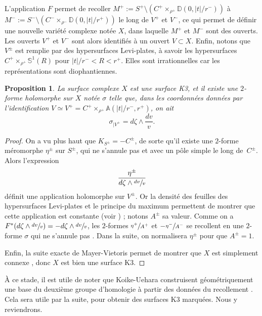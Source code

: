 \documentclass[JEP,XML,SOM,Unicode,francais,published]{cedram}
\newtheorem{prop}[thm]{Proposition}
\theoremstyle{definition}
\begin{document}
L'application $F$ permet de recoller $M^+:= S^+\setminus(C^+\times_{\rho^{+}}\mathbb{D}(0, |t|/r^-))$ à $M^-:= S^-\setminus(C^-\times_{\rho^{-}}\mathbb{D}(0, |t|/r^+))$ le long de $V^+$ et $V^-$, ce qui permet de définir une nouvelle variété complexe notée $X$, dans laquelle $M^+$ et $M^-$ sont des ouverts. Les ouverts $V^+$ et $V^-$ sont alors identifiés à un ouvert $V \subset X$. Enfin, notons que $V^\pm$ est remplie par des hypersurfaces Levi-plates, à savoir les hypersurfaces $C^+\times_{\rho^+} \mathbb{S}^1(R)$ pour $|t|/r^- < R < r^+$. Elles sont irrationnelles car les représentations sont diophantiennes.

\begin{prop}La surface complexe $X$ est une surface K3, et il existe une $2$-forme holomorphe sur $X$ notée $\sigma$ telle que, dans les coordonnées données par l'identification $V \simeq V^+ = C^+\times_{\rho^+} \mathbb{A}(|t|/r^-, r^+)$, on ait
\[\sigma_{|V^+} = d\zeta \wedge \frac{dv}{v}.\]
\end{prop}
\begin{proof}On a vu plus haut que $K_{S^\pm} = -C^\pm$, de sorte qu'il existe une $2$-forme méromorphe $\eta^\pm$ sur $S^\pm$, qui ne s'annule pas et avec un pôle simple le long de~$C^\pm$. Alors l'expression
\[\frac{\eta^\pm}{d\zeta \wedge \sfrac{dv}{v}}\]
définit une application holomorphe sur $V^\pm$. Or la densité des feuilles des hypersurfaces Levi-plates et le principe du maximum permettent de montrer que cette application est constante (voir \cite[lem.\,2.2]{koike2019gluing}) ; notons $A^\pm$ sa valeur. Comme on a $F^*(d\zeta \wedge \sfrac{dv}{v}) = -d\zeta\wedge\sfrac{dv}{v}$, les $2$-formes $\sfrac{\eta^+}{A^+}$ et $-\sfrac{\eta^-}{A^-}$ se recollent en une $2$-forme $\sigma$ qui ne s'annule pas \cite[prop.\,2.1]{koike2019gluing}. Dans la suite, on normalisera $\eta^\pm$ pour que $A^\pm = 1$.

Enfin, la suite exacte de Mayer-Vietoris permet de montrer que $X$ est simplement connexe \cite[prop.\,2.1]{koike2019gluing}, donc $X$ est bien une surface K3.
\end{proof}

À ce stade, il est utile de noter que Koike-Uehara construisent géométriquement une base du deuxième groupe d'homologie à partir des données du recollement \hbox{\cite[\S\,3]{koike2019gluing}}. Cela sera utile par la suite, pour obtenir des surfaces K3 marquées. Nous y reviendrons.
\end{document}
